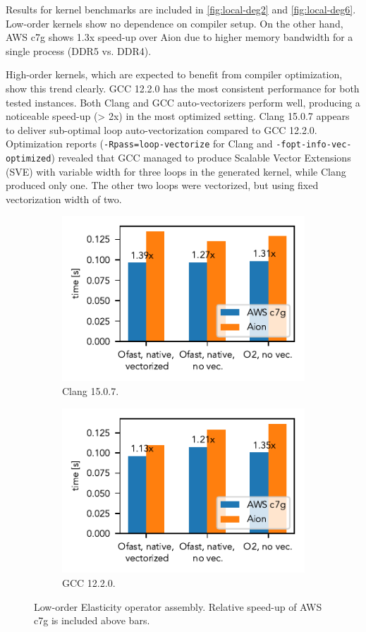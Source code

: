 Results for kernel benchmarks are included in \autoref{fig:local-deg2} and
\autoref{fig:local-deg6}. Low-order kernels show no dependence on compiler
setup. On the other hand, AWS c7g shows 1.3x speed-up over Aion due to higher
memory bandwidth for a single process (DDR5 vs. DDR4).

High-order kernels, which are expected to benefit from compiler optimization,
show this trend clearly. GCC 12.2.0 has the most consistent performance for
both tested instances. Both Clang and GCC auto-vectorizers perform well,
producing a noticeable speed-up (> 2x) in the most optimized setting. Clang
15.0.7 appears to deliver sub-optimal loop auto-vectorization compared to GCC
12.2.0. Optimization reports (\texttt{-Rpass=loop-vectorize} for Clang and
\texttt{-fopt-info-vec-optimized}) revealed that GCC managed to produce
Scalable Vector Extensions (SVE) with variable width for three loops in the
generated kernel, while Clang produced only one. The other two loops were
vectorized, but using fixed vectorization width of two.

\begin{figure}
    \begin{subfigure}{.5\textwidth}
        \centering
        \includegraphics{chapters/chp1/imgs/kernel_plots/local_operator_clang_deg2.pdf}
        \caption{Clang 15.0.7.}
        \label{fig:local-clang-deg2}
    \end{subfigure}%
    \begin{subfigure}{.5\textwidth}
        \centering
        \includegraphics{chapters/chp1/imgs/kernel_plots/local_operator_gcc_deg2.pdf}
        \caption{GCC 12.2.0.}
        \label{fig:local-gcc-deg2}
    \end{subfigure}
    \caption{Low-order Elasticity operator assembly. Relative speed-up of AWS
    c7g is included above bars.}
    \label{fig:local-deg2}
\end{figure}

